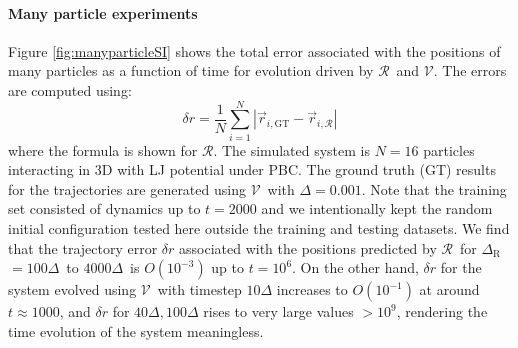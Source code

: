 \documentclass[aps,prl,twocolumn,superscriptaddress,tightenlines,longbibliography, reprint]{revtex4-1}
\newcommand{\dt}{$\Delta$}
\newcommand{\dtR}{$\Delta_{\textrm{R}}$}
\newcommand{\R}{$\mathscr{R}$}
\newcommand{\V}{$\mathscr{V}$}
\begin{document}
\paragraph{Many particle experiments}
Figure \ref{fig:manyparticleSI} shows the total error associated with the positions of many particles as a function of time for evolution driven by \R\ and \V. The errors are computed using:
\begin{equation}\label{eq:avg_pos_error}
    \delta r = \frac{1}{N}\sum_{i=1}^{N} \left| \vec{r}_{i, \mathrm{GT}}- \vec{r}_{i, \mathscr{R}}\right|
\end{equation}
where the formula is shown for $\mathscr{R}$. 
The simulated system is $N=16$ particles interacting in 3D with LJ potential under PBC. The ground truth (GT) results for the trajectories are generated using \V\ with $\Delta=0.001$. Note that the training set consisted of dynamics up to $t=2000$ and we intentionally kept the random initial configuration tested here outside the training and testing datasets. 
We find that the trajectory error $\delta r$ associated with the positions predicted by \R\ for \dtR$=100$\dt\ to $4000$\dt\ is $O(10^{-3})$ up to $t=10^6$. On the other hand, $\delta r$ for the system evolved using \V\ with timestep $10\Delta$ increases to $O(10^{-1})$ at around $t \approx 1000$, and $\delta r$ for $40\Delta, 100\Delta$ rises to very large values $>10^{9}$, rendering the time evolution of the system meaningless.


\end{document}
